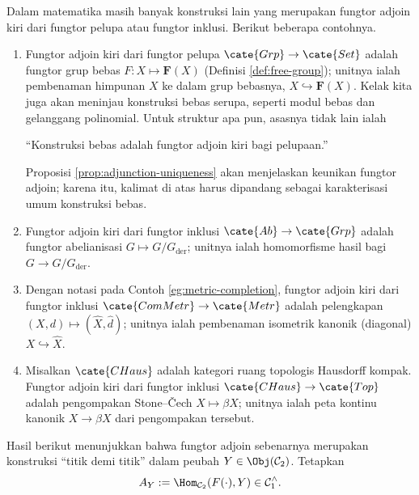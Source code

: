 \begin{example}\label{eg:forgetful-adjunction}
	Dalam matematika masih banyak konstruksi lain yang merupakan fungtor adjoin kiri dari fungtor pelupa atau fungtor inklusi. Berikut beberapa contohnya.
	\begin{enumerate}
		\item Fungtor adjoin kiri dari fungtor pelupa $\cate{Grp} \to \cate{Set}$ adalah fungtor grup bebas $F: X \mapsto \mathbf{F}(X)$ (Definisi \ref{def:free-group}); unitnya ialah pembenaman himpunan $X$ ke dalam grup bebasnya, $X \hookrightarrow \mathbf{F}(X)$. Kelak kita juga akan meninjau konstruksi bebas serupa, seperti modul bebas dan gelanggang polinomial. Untuk struktur apa pun, asasnya tidak lain ialah
		\begin{center}
			``Konstruksi bebas adalah fungtor adjoin kiri bagi pelupaan.''
		\end{center}
		Proposisi \ref{prop:adjunction-uniqueness} akan menjelaskan keunikan fungtor adjoin; karena itu, kalimat di atas harus dipandang sebagai karakterisasi umum konstruksi bebas.
		\item Fungtor adjoin kiri dari fungtor inklusi $\cate{Ab} \to \cate{Grp}$ adalah fungtor abelianisasi $G \mapsto G/G_\text{der}$; unitnya ialah homomorfisme hasil bagi $G \to G/G_\text{der}$.
		\item Dengan notasi pada Contoh \ref{eg:metric-completion}, fungtor adjoin kiri dari fungtor inklusi $\cate{ComMetr} \to \cate{Metr}$ adalah pelengkapan $(X, d) \mapsto (\hat{X}, \hat{d})$; unitnya ialah pembenaman isometrik kanonik (diagonal) $X \hookrightarrow \hat{X}$.
		\item Misalkan $\cate{CHaus}$ adalah kategori ruang topologis Hausdorff kompak. Fungtor adjoin kiri dari fungtor inklusi $\cate{CHaus} \to \cate{Top}$ adalah pengompakan Stone--Čech $X \mapsto \beta X$; unitnya ialah peta kontinu kanonik $X \to \beta X$ dari pengompakan tersebut.
	\end{enumerate}
\end{example}

Hasil berikut menunjukkan bahwa fungtor adjoin sebenarnya merupakan konstruksi ``titik demi titik'' dalam peubah $Y \in \Obj(\mathcal{C}_2)$. Tetapkan
\[ A_Y := \Hom_{\mathcal{C}_2}(F(\cdot), Y) \in \mathcal{C}_1^\wedge. \]

